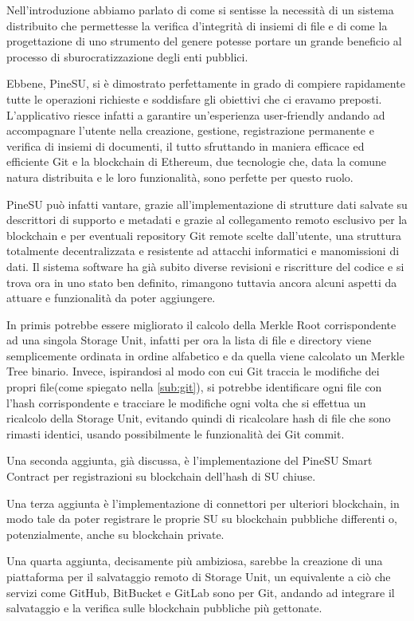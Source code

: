 \label{cap:sf}
Nell'introduzione abbiamo parlato di come si sentisse la necessità
di un sistema distribuito che permettesse la verifica d'integrità
di insiemi di file e di come la progettazione di uno strumento del
genere potesse portare un grande beneficio al processo di
sburocratizzazione degli enti pubblici.

Ebbene, PineSU, si è dimostrato perfettamente in grado di
compiere rapidamente tutte le operazioni richieste e soddisfare gli
obiettivi che ci eravamo preposti.
L'applicativo riesce infatti a garantire un'esperienza user-friendly andando ad 
accompagnare l'utente nella 
creazione, gestione, registrazione permanente e verifica di insiemi di documenti,
il tutto sfruttando in maniera efficace ed efficiente Git e la blockchain di Ethereum,
due tecnologie che, data la comune natura distribuita e le loro funzionalità,
sono perfette per questo ruolo.

PineSU può infatti vantare, grazie all'implementazione di strutture dati salvate
su descrittori di supporto e metadati e grazie al collegamento remoto esclusivo per la blockchain
e per eventuali repository Git remote scelte dall'utente, una struttura totalmente
decentralizzata e resistente ad attacchi informatici e manomissioni di dati.
Il sistema software ha già subito diverse revisioni e riscritture del codice e si trova ora in uno
stato ben definito, rimangono tuttavia ancora alcuni aspetti da attuare e funzionalità da poter aggiungere.

In primis potrebbe essere migliorato il calcolo della Merkle Root corrispondente
ad una singola Storage Unit, infatti per ora la lista di file e directory viene
semplicemente ordinata in ordine alfabetico e da quella viene calcolato
un Merkle Tree binario. Invece, ispirandosi al modo con cui Git traccia le modifiche
dei propri file(come spiegato nella \autoref{sub:git}),
si potrebbe identificare ogni file con l'hash corrispondente e tracciare le modifiche ogni
volta che si effettua un ricalcolo della Storage Unit, evitando quindi di ricalcolare hash
di file che sono rimasti identici, usando possibilmente le funzionalità dei Git commit.

Una seconda aggiunta, già discussa, è l'implementazione del PineSU Smart Contract
per registrazioni su blockchain dell'hash di SU chiuse.

Una terza aggiunta è l'implementazione di connettori per ulteriori blockchain, in modo tale
da poter registrare le proprie SU su blockchain pubbliche differenti o, potenzialmente,
anche su blockchain private.

Una quarta aggiunta, decisamente più ambiziosa, sarebbe la creazione di una piattaforma
per il salvataggio remoto di Storage Unit, un equivalente a ciò che servizi come GitHub,
BitBucket e GitLab sono per Git, andando ad integrare il salvataggio e la verifica sulle
blockchain pubbliche più gettonate.